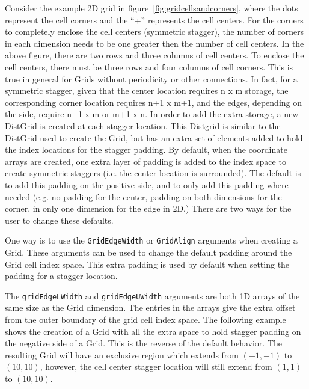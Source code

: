    Consider the example 2D grid in figure~\ref{fig:gridcellsandcorners}, where the dots represent the cell corners
   and the ``+'' represents the cell centers. For the corners to completely
   enclose the cell centers (symmetric stagger), the number of corners in each
   dimension needs to be one greater then the number of cell centers. In the above
   figure, there are two rows and three columns of cell centers. To enclose the
   cell centers, there must be three rows and four columns of cell corners.
   This is true in general for Grids without periodicity or
   other connections.  In fact, for a symmetric stagger, given that the center
   location requires n x m storage, the corresponding corner location
   requires n+1 x m+1, and the edges, depending on the side, require n+1 x m or
   m+1 x n.  In order to add the extra storage, a new DistGrid is
   created at each stagger location. This Distgrid is similar to the DistGrid
   used to create the Grid, but has an extra set of elements added to hold the
   index locations for the stagger padding.
   By default, when the coordinate arrays are created, one extra
   layer of padding is added to the index space to create symmetric staggers
   (i.e. the center location is surrounded). The default is to add this padding
   on the positive side, and to only add this padding where needed
   (e.g. no padding for the center, padding
   on both dimensions for the corner, in only one dimension for the
   edge in 2D.) There are two ways for the user to change
   these defaults.
  
   One way is to use the {\tt GridEdgeWidth} or {\tt GridAlign} arguments
   when creating a Grid. These arguments can be used to change the default padding
   around the Grid cell index space. This extra padding is used by default
   when setting the padding for a stagger location.
  
   The {\tt gridEdgeLWidth} and
   {\tt gridEdgeUWidth} arguments are both 1D arrays of the
   same size as the Grid dimension. The entries in the arrays
   give the extra offset from the outer boundary of
   the grid cell index space. The following example shows the
   creation of a Grid with all the extra space to hold stagger padding
   on the negative side of a Grid. This is the reverse of
   the default behavior. The resulting Grid will have
   an exclusive region which extends from $(-1,-1)$ to
   $(10,10)$, however, the cell center stagger location
   will still extend from $(1,1)$ to $(10,10)$. 

